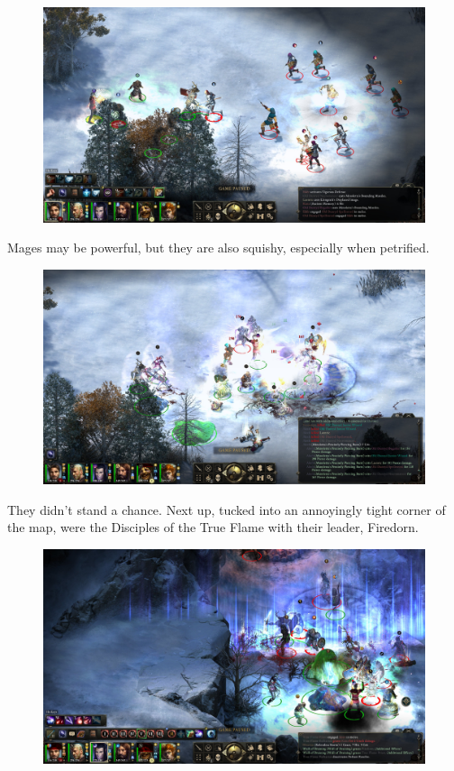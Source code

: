 \documentclass{article}
\begin{document}
\begin{figure}
\includegraphics[scale=0.33]{files/blog/2019_08_17_poe_potd_wmpt1/2019_08_17_laenric_1.jpg}
\end{figure}

Mages may be powerful, but they are also squishy, especially when petrified.

\begin{figure}
\includegraphics[scale=0.33]{files/blog/2019_08_17_poe_potd_wmpt1/2019_08_17_laenric_2.jpg}
\end{figure}

They didn't stand a chance.  Next up, tucked into an annoyingly tight corner of the map, were the Disciples of the True Flame with their leader, Firedorn.

\begin{figure}
\includegraphics[scale=0.33]{files/blog/2019_08_17_poe_potd_wmpt1/2019_08_17_firedorn_1.jpg}
\end{figure}
\end{document}
